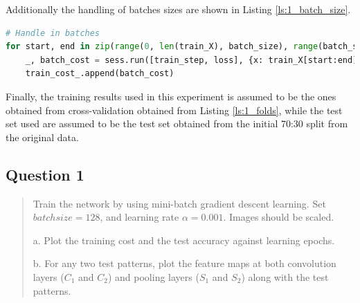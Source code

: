 Additionally the handling of batches sizes are shown in Listing \ref{ls:1_batch_size}.

\begin{lstlisting}[language=Python, caption= Batch size setup, label=ls:1_batch_size]
# Handle in batches
for start, end in zip(range(0, len(train_X), batch_size), range(batch_size, len(train_X), batch_size)):
    _, batch_cost = sess.run([train_step, loss], {x: train_X[start:end], y_: train_Y[start:end]})
    train_cost_.append(batch_cost)
\end{lstlisting}

Finally, the training results used in this experiment is assumed to be the ones obtained from cross-validation obtained from Listing \ref{ls:1_folds}, while the test set used are assumed to be the test set obtained from the initial 70:30 split from the original data.

\subsection{Question 1}
\label{1q1}
\begin{quote}
Train the network by using mini-batch gradient descent learning. Set $batch size =128$, and learning rate $\alpha = 0.001$. Images should be scaled.

a. Plot the training cost and the test accuracy against learning epochs.

b. For any two test patterns, plot the feature maps at both convolution layers ($C_1$ and $C_2$) and pooling layers ($S_1$ and $S_2$) along with the test patterns.
\end{quote}

